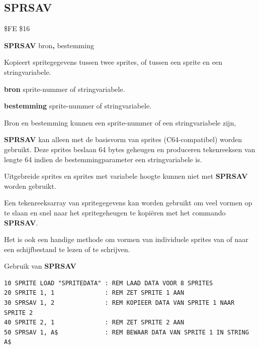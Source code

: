 \subsection{SPRSAV}
\begin{description}[leftmargin=2cm,style=nextline]
\item [Token:]    \$FE \$16

\item [Formaat:]   {\bf SPRSAV} bron{\bf,} bestemming

\item [Gebruik:]    Kopieert spritegegevens tussen twee sprites, of tussen een sprite en een stringvariabele.

                  {\bf bron} sprite-nummer of stringvariabele.

                  {\bf bestemming} sprite-nummer of stringvariabele.

\item [Opmerkingen:]  Bron en bestemming kunnen een sprite-nummer of een stringvariabele zijn,

                  {\bf SPRSAV} kan alleen met de basisvorm van sprites (C64-compatibel) worden gebruikt. Deze sprites beslaan 64 bytes geheugen en produceren tekenreeksen van lengte 64 indien de bestemmingparameter een stringvariabele is.

                  Uitgebreide sprites en sprites met variabele hoogte kunnen niet met {\bf SPRSAV} worden gebruikt.

                  Een tekenreeksarray van spritegegevens kan worden gebruikt om veel vormen op te slaan en snel naar het spritegeheugen te kopiëren met het commando {\bf SPRSAV}.

                  Het is ook een handige methode om vormen van individuele sprites van of naar een schijfbestand te lezen of te schrijven.

\item [Voorbeeld:]  Gebruik van {\bf SPRSAV}

\begin{tcolorbox}[colback=black,coltext=white]
\verbatimfont{\codefont}
\begin{verbatim}
10 SPRITE LOAD "SPRITEDATA" : REM LAAD DATA VOOR 8 SPRITES
20 SPRITE 1, 1              : REM ZET SPRITE 1 AAN
30 SPRSAV 1, 2              : REM KOPIEER DATA VAN SPRITE 1 NAAR SPRITE 2
40 SPRITE 2, 1              : REM ZET SPRITE 2 AAN
50 SPRSAV 1, A$             : REM BEWAAR DATA VAN SPRITE 1 IN STRING A$
\end{verbatim}
\end{tcolorbox}
\end{description}

